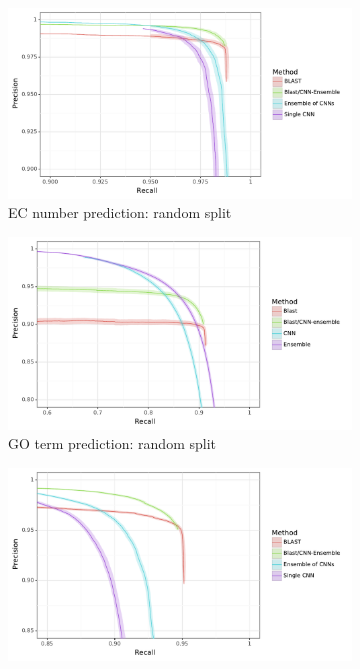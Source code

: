 \begin{figure}[ht] 
  \begin{subfigure}[b]{0.5\linewidth}
    \centering
    \includegraphics[width=1\linewidth]{Figures/random_truncated.pdf}
    \caption{EC number prediction: random split} 
    \label{with_ensemble:a} 
    \vspace{4ex}
  \end{subfigure}%
  \begin{subfigure}[b]{0.5\linewidth}
    \centering
    \includegraphics[width=1\linewidth]{Figures/random_truncated_go.pdf}
    \caption{GO term prediction: random split} 
    \label{with_ensemble:b} 
    \vspace{4ex}
  \end{subfigure} 
  \begin{subfigure}[b]{0.5\linewidth}
    \centering
    \includegraphics[width=1\linewidth]{Figures/clustered_truncated.pdf}

\end{subfigure}
\end{figure}
